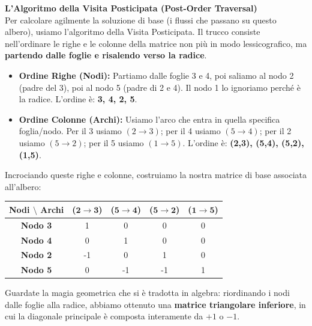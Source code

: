 \documentclass[12pt, a4paper]{article}
\renewcommand{\arraystretch}{1.25}
\begin{document}
	\vspace{0.4cm}
	\vspace{0.4cm}
	\textbf{L'Algoritmo della Visita Posticipata (Post-Order Traversal)}\\
	Per calcolare agilmente la soluzione di base (i flussi che passano su questo albero), usiamo l'algoritmo della Visita Posticipata. Il trucco consiste nell'ordinare le righe e le colonne della matrice non più in modo lessicografico, ma \textbf{partendo dalle foglie e risalendo verso la radice}.
	
	\begin{itemize}[label=\textcolor{titlecolor}{\Large\textbullet}, itemsep=2pt, leftmargin=1.5cm]
		\item \textbf{Ordine Righe (Nodi):} Partiamo dalle foglie 3 e 4, poi saliamo al nodo 2 (padre del 3), poi al nodo 5 (padre di 2 e 4). Il nodo 1 lo ignoriamo perché è la radice. L'ordine è: \textbf{3, 4, 2, 5}.
		\item \textbf{Ordine Colonne (Archi):} Usiamo l'arco che entra in quella specifica foglia/nodo. Per il 3 usiamo $(2\to3)$; per il 4 usiamo $(5\to4)$; per il 2 usiamo $(5\to2)$; per il 5 usiamo $(1\to5)$. L'ordine è: \textbf{(2,3), (5,4), (5,2), (1,5)}.
	\end{itemize}
	
	Incrociando queste righe e colonne, costruiamo la nostra matrice di base associata all'albero:
	
	\begin{table}[H]
		\centering
		\renewcommand{\arraystretch}{1.3}
		\begin{tabular}{|c|c|c|c|c|}
			\hline
			\textbf{Nodi $\setminus$ Archi} & \textbf{($\mathbf{2\to3}$)} & \textbf{($\mathbf{5\to4}$)} & \textbf{($\mathbf{5\to2}$)} & \textbf{($\mathbf{1\to5}$)} \\ \hline
			\textbf{Nodo 3} & 1 & 0 & 0 & 0 \\ \hline
			\textbf{Nodo 4} & 0 & 1 & 0 & 0 \\ \hline
			\textbf{Nodo 2} & -1 & 0 & 1 & 0 \\ \hline
			\textbf{Nodo 5} & 0 & -1 & -1 & 1 \\ \hline
		\end{tabular}
	\end{table}
	Guardate la magia geometrica che si è tradotta in algebra: riordinando i nodi dalle foglie alla radice, abbiamo ottenuto una \textbf{matrice triangolare inferiore}, in cui la diagonale principale è composta interamente da $+1$ o $-1$. 
	
\end{document}
